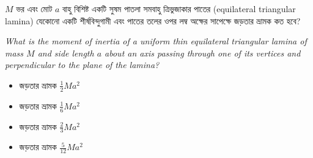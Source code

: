 \documentclass[12pt, a4paper]{article}
\begin{document}
\begin{tcolorbox}[questionbox={প্রশ্ন (Question) 15}]
    \noindent
    $M$ ভর এবং মোট $a$ বাহু বিশিষ্ট একটি সুষম পাতলা সমবাহু ত্রিভুজাকার পাতের (equilateral triangular lamina) যেকোনো একটি শীর্ষবিন্দুগামী এবং পাতের তলের ওপর লম্ব অক্ষের সাপেক্ষে জড়তার ভ্রামক কত হবে?
    
    \vspace{0.8em}
    \begin{english}
    \noindent\textit{\color{darkgray}
    What is the moment of inertia of a uniform thin equilateral triangular lamina of mass $M$ and side length $a$ about an axis passing through one of its vertices and perpendicular to the plane of the lamina?
    }
    \end{english}
\end{tcolorbox}

\vspace{1em}
\begin{center}
\end{center}
\vspace{1em}

\begin{itemize}[label={}, leftmargin=1cm, itemsep=0.5em]
    \item[\textbf{A)}] জড়তার ভ্রামক $\frac{1}{2} M a^2$
    \item[\textbf{B)}] জড়তার ভ্রামক $\frac{1}{6} M a^2$
    \item[\textbf{C)}] জড়তার ভ্রামক $\frac{2}{3} M a^2$
    \item[\textbf{D)}] জড়তার ভ্রামক $\frac{5}{12} M a^2$
\end{itemize}
\end{document}
